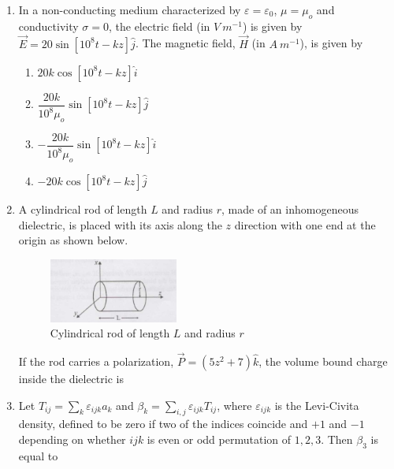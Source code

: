 \documentclass[14pt, a4paper]{extarticle}
\begin{document}
\begin{enumerate}[label=\textbf{Q. \arabic*}, start=21]
\item In a non-conducting medium characterized by $\varepsilon = \varepsilon_0$, $\mu = \mu_o$ and conductivity $\sigma = 0$, the electric field (in $V~m^{-1}$) is given by $\vec{E} = 20\sin[10^8 t - kz] \hat{j}$. The magnetic field, $\vec{H}$ (in $A~m^{-1}$), is given by
\begin{enumerate}[label=(\Alph*)]
\item $20k \cos[10^8 t - kz] \hat{i}$
\item $\dfrac{20k}{10^8 \mu_o}\sin[10^8 t - kz] \hat{j}$
\item $-\dfrac{20k}{10^8 \mu_o}\sin[10^8 t - kz] \hat{i}$
\item $-20k \cos[10^8 t - kz] \hat{j}$
\end{enumerate}

\item A cylindrical rod of length $L$ and radius $r$, made of an inhomogeneous dielectric, is placed with its axis along the $z$ direction with one end at the origin as shown below.
\begin{figure}[H]
\centering
\includegraphics[width=0.4\textwidth]{figs/Q25fig.png}
\caption{Cylindrical rod of length $L$ and radius $r$ }
\label{fig:q25}
\end{figure}
If the rod carries a polarization, $\vec{P} = (5z^2 + 7)\hat{k}$, the volume bound charge inside the dielectric is
\begin{enumerate}[label=(\Alph*)]
\end{enumerate}

\item Let $T_{ij} = \sum_k \varepsilon_{ijk} a_k$ and $\beta_k = \sum_{i,j} \varepsilon_{ijk} T_{ij}$, where $\varepsilon_{ijk}$ is the Levi-Civita density, defined to be zero if two of the indices coincide and $+1$ and $-1$ depending on whether $ijk$ is even or odd permutation of $1,2,3$. Then $\beta_3$ is equal to
\begin{enumerate}[label=(\Alph*)]
\end{enumerate}


\end{enumerate}
\end{document}
